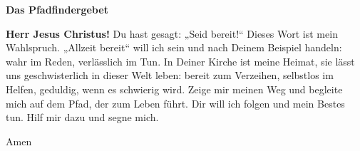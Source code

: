 
\newpage
\vspace*{\fill}
\begin{center}
\begin{minipage}{.6\textwidth}

    \begin{center}
        \textbf{\LARGE{Das Pfadfindergebet} }
        \vspace{.5cm}
    \end{center}

    \begingroup\obeylines\Large
    \textbf{Herr Jesus Christus!}
        Du hast gesagt: „Seid bereit!“
        Dieses Wort ist mein Wahlspruch.
        \bigskip
        „Allzeit bereit“ will ich sein
        und nach Deinem Beispiel handeln:
        wahr im Reden,
        verlässlich im Tun.
        \bigskip
        In Deiner Kirche ist meine Heimat,
        sie lässt uns geschwisterlich
        in dieser Welt leben:
        bereit zum Verzeihen,
        selbstlos im Helfen,
        geduldig, wenn es schwierig wird.
        \bigskip
        Zeige mir meinen Weg
        und begleite mich auf dem Pfad,
        der zum Leben führt.
        \bigskip
        Dir will ich folgen und mein Bestes tun.
        Hilf mir dazu und segne mich.
        \begin{flushright}Amen\end{flushright}
    \endgroup
    \vspace{2cm}
\end{minipage}
\end{center}
\vfill %
\newpage